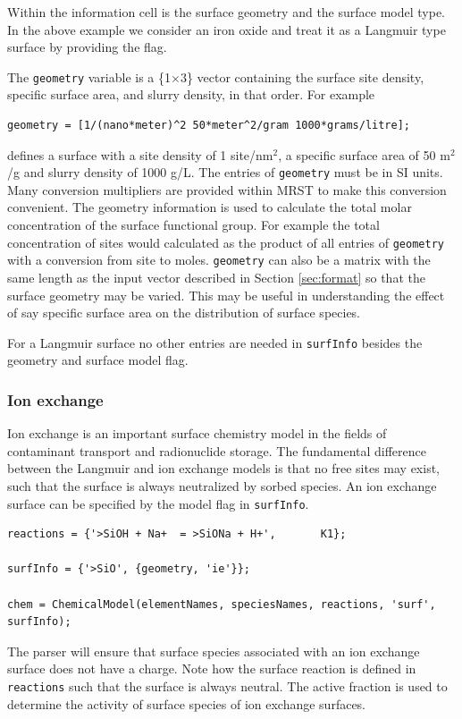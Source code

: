 \documentclass{article}
\begin{document}
Within the information cell is the surface geometry and the surface model type. In the above example we consider an iron oxide and treat it as a Langmuir type surface by providing the  flag.

The \verb|geometry| variable is a \{1$\times$3\} vector containing the surface site density, specific surface area, and slurry density, in that order. For example

\begin{lstlisting}
geometry = [1/(nano*meter)^2 50*meter^2/gram 1000*grams/litre];
\end{lstlisting}

defines a surface with a site density of 1 site/nm$^2$, a specific surface area of 50 m$^2$/g and slurry density of 1000 g/L.  The entries of \verb|geometry| must be in SI units. Many conversion multipliers are provided within MRST to make this conversion convenient. The geometry information is used to calculate the total molar concentration of the surface functional group. For example the total concentration of  sites would calculated as the product of all entries of \verb|geometry| with a conversion from site to moles. \verb|geometry| can also be a matrix with the same length as the input vector described in Section \ref{sec:format} so that the surface geometry may be varied. This may be useful in understanding the effect of say specific surface area on the distribution of surface species. 

For a Langmuir surface no other entries are needed in \verb|surfInfo| besides the geometry and surface model flag.

\subsubsection{Ion exchange}
Ion exchange is an important surface chemistry model in the fields of contaminant transport and radionuclide storage. The fundamental difference between the Langmuir and ion exchange models is that no free sites may exist, such that the surface is always neutralized by sorbed species. An ion exchange surface can be specified by the  model flag in \verb|surfInfo|. 

\begin{lstlisting}
reactions = {'>SiOH + Na+  = >SiONa + H+',       K1};
            
surfInfo = {'>SiO', {geometry, 'ie'}};

chem = ChemicalModel(elementNames, speciesNames, reactions, 'surf', surfInfo);
\end{lstlisting}
The parser will ensure that surface species associated with an ion exchange surface does not have a charge. Note how the surface reaction is defined in \verb|reactions| such that the surface is always neutral. The active fraction is used to determine the activity of surface species of ion exchange surfaces. 
\end{document}
